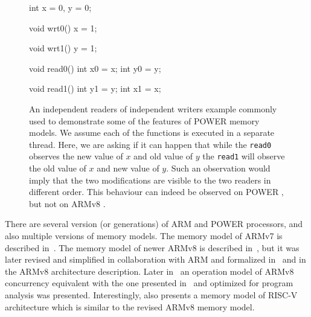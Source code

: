 \begin{figure}[tp]
    \begin{cppcode}
        int x = 0, y = 0;
    \end{cppcode}
    \begin{multicols}{4}
        \begin{cppcode}
          void wrt0()
          {
            x = 1;
          }
        \end{cppcode}
        \columnbreak
        \begin{cppcode}
          void wrt1()
          {
            y = 1;
          }
        \end{cppcode}
        \columnbreak
        \begin{cppcode}
          void read0()
          {
            int x0 = x;
            int y0 = y;
          }
        \end{cppcode}
        \columnbreak
        \begin{cppcode}
          void read1()
          {
            int y1 = y;
            int x1 = x;
          }
        \end{cppcode}
    \end{multicols}
    \caption{
        An independent readers of independent writers example commonly used to
        demonstrate some of the features of POWER memory models.
        We assume each of the functions is executed in a separate thread.
        Here, we are asking if it can happen that while the \texttt{read0}
        observes the new value of $x$ and old value of $y$ the \texttt{read1}
        will observe the old value of $x$ and new value of $y$.
        Such an observation would imply that the two modifications are visible
        to the two readers in different order.
        This behaviour can indeed be observed on POWER \cite{Sarkar2011}, but
        not on ARMv8 \cite{Pulte2017}.
    }\label{fig:prelim:iriw}
\end{figure}

There are several version (or generations) of ARM and POWER processors, and
also multiple versions of memory models.
The memory model of ARMv7 is described in~.
The memory model of newer ARMv8 is described in~, but it was
later revised and simplified in collaboration with ARM and formalized
in~ and in the ARMv8 architecture description.
Later in~ an operation model of ARMv8 concurrency equivalent
with the one presented in~ and optimized for program analysis
was presented.
Interestingly,  also presents a memory model of RISC-V
architecture which is similar to the revised ARMv8 memory model.

